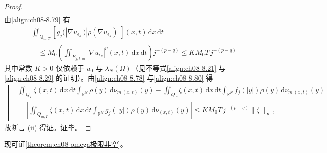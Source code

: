 \documentclass[../../main.tex]{subfiles}%
\begin{document}
\begin{proof}
\begin{align*}
\end{align*}
由\eqref{align:ch08-8.79} 有
\begin{align}
&\iint_{Q_{m,T}}[g_j(|\nabla u_{\epsilon_k|})|\rho(\nabla u_{\epsilon_k})|](x,t)\,\mathrm{d}x\,\mathrm{d}t\nonumber\\
&\quad\leqslant M_0\left(\iint_{E_{j,k,m}}|\nabla u_{\epsilon_k}|^p(x,t)\,\mathrm{d}x\,\mathrm{d}t\right)j^{-(p-q)}
\leqslant KM_0T\,j^{-(p-q)} \label{align:ch08-8.80}
\end{align}
其中常数 $K>0$ 仅依赖于 $u_0$ 与 $\lambda_N(\Omega)$（见不等式\eqref{align:ch08-8.21} 与\eqref{align:ch08-8.29} 的证明）。由\eqref{align:ch08-8.78} 与\eqref{align:ch08-8.80} 得
\begin{align*}
\left|
\begin{aligned}
&\iint_{Q_T}\zeta(x,t)\,\mathrm{d}x\,\mathrm{d}t\int_{\mathbb{R}^N}\rho(y)\,\mathrm{d}\nu_{m\,(x,t)}(y)
-\iint_{Q_T}\zeta(x,t)\,\mathrm{d}x\,\mathrm{d}t\int_{\mathbb{R}^N}f_j(|y|)\rho(y)\,\mathrm{d}\nu_{m\,(x,t)}(y)\\
&=\left|\iint_{Q_{m,T}}\zeta(x,t)\,\mathrm{d}x\,\mathrm{d}t\int_{\mathbb{R}^N}g_j(|y|)\rho(y)\,\mathrm{d}\nu_{(x,t)}(y)\right|
\leqslant KM_0T\,j^{-(p-q)}\|\zeta\|_\infty,
\end{aligned}
\right.
\end{align*}
故断言 (ii) 得证。证毕。
\end{proof}

现可证\cref{theorem:ch08-omega极限非空}。
\end{document}
